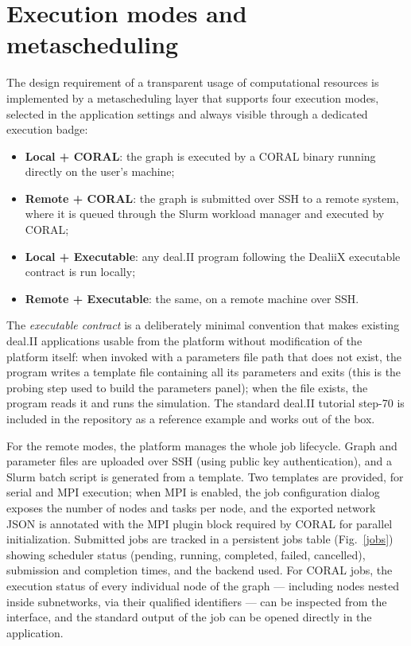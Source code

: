 \documentclass[a4paper,12pt]{article}
\begin{document}
\FloatBarrier

\section{\textcolor{EUblue}{Execution modes and metascheduling}}
\label{sec:execution}

The design requirement of a transparent usage of computational resources is
implemented by a metascheduling layer that supports four execution modes,
selected in the application settings and always visible through a dedicated
execution badge:

\begin{itemize}
    \item \textbf{Local + CORAL}: the graph is executed by a CORAL binary
        running directly on the user's machine;
    \item \textbf{Remote + CORAL}: the graph is submitted over SSH to a
        remote system, where it is queued through the Slurm workload manager
        and executed by CORAL;
    \item \textbf{Local + Executable}: any deal.II program following the
        DealiiX executable contract is run locally;
    \item \textbf{Remote + Executable}: the same, on a remote machine over
        SSH.
\end{itemize}

The \emph{executable contract} is a deliberately minimal convention that
makes existing deal.II applications usable from the platform without
modification of the platform itself: when invoked with a parameters file
path that does not exist, the program writes a template file containing all
its parameters and exits (this is the probing step used to build the
parameters panel); when the file exists, the program reads it and runs the
simulation. The standard deal.II tutorial step-70 is included in the
repository as a reference example and works out of the box.

For the remote modes, the platform manages the whole job lifecycle. Graph
and parameter files are uploaded over SSH (using public key authentication),
and a Slurm batch script is generated from a template. Two templates are
provided, for serial and MPI execution; when MPI is enabled, the job
configuration dialog exposes the number of nodes and tasks per node, and the
exported network JSON is annotated with the MPI plugin block required by
CORAL for parallel initialization. Submitted jobs are tracked in a
persistent jobs table (Fig.~\ref{jobs}) showing scheduler status (pending,
running, completed, failed, cancelled), submission and completion times, and
the backend used.
For CORAL jobs, the execution status of every individual node of the graph
--- including nodes nested inside subnetworks, via their qualified
identifiers --- can be inspected from the interface, and the standard output
of the job can be opened directly in the application.
\end{document}
